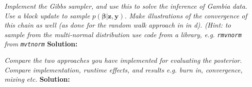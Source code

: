 \emph{ Implement the Gibbs sampler, and use this to solve the inference of Gambia data. Use
a block update to sample $p(\boldsymbol{\beta} | \boldsymbol{z}, \boldsymbol{y})$. Make illustrations of the convergence of this chain as well (as done for the random walk approach in in d). (Hint: to sample from the multi-normal distribution use code from a library, e.g. \texttt{rmvnorm} from \texttt{mvtnorm}} \spaze 
\textbf{Solution:} \spaze

\emph{Compare the two approaches you have implemented for evaluating the posterior.
Compare implementation, runtime effects, and results e.g. burn in, convergence, mixing
etc.} \spaze 
\textbf{Solution:} \spaze